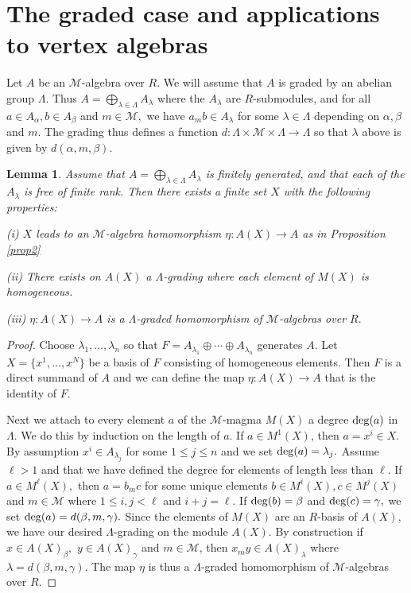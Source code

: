 \documentclass{article}
\newtheorem{lem}[thm]{Lemma}
\theoremstyle{definition}
\def\Mu{\ensuremath{\mathcal{M}}}
\begin{document}
	\section{The graded case and applications to vertex algebras}

Let $A$ be an $\Mu$-algebra over $R.$ We will assume that $A$ is graded by an abelian group $\Lambda.$ Thus $A = \bigoplus_{\lambda \in \Lambda} A_\lambda$ where the $A_\lambda$ are $R$-submodules, and for all $a \in A_\alpha, b \in A_\beta$ and $ m \in \Mu,$ we have $a _m b \in A_\lambda$ for some $\lambda \in \Lambda$ depending on $\alpha, \beta$ and $m.$ The grading thus  defines a function $d \colon \Lambda \times \Mu \times \Lambda \to \Lambda$ so that $\lambda$ above is given by $d(\alpha, m, \beta).$ 
\begin{lem}\label{graded} Assume that $A = \bigoplus_{\lambda \in \Lambda} A_\lambda$ is finitely generated, and that each of the $A_\lambda$ is free of finite rank. Then there exists a finite set $X$ with the following properties:

(i) $X$ leads to an $\Mu$-algebra homomorphism  $\eta \colon A(X) \to A$ as in Proposition \ref{prop2}

(ii) There exists on $A(X)$ a $\Lambda$-grading  where each element of $M(X)$ is homogeneous.

(iii)   $\eta \colon A(X) \to A$ is a $\Lambda$-graded homomorphism of $\Mu$-algebras over $R.$ 
\end{lem}
\begin{proof} Choose $\lambda_1, \dots, \lambda_n$ so that $F = A_{\lambda_1} \oplus \cdots \oplus A_{\lambda_n}$ generates $A.$  Let $X = \{x^1, \dots, x^N\}$ be a basis of $F$ consisting of homogeneous elements. Then $F$ is a direct summand of $A$ and we can define the map $\eta \colon A(X) \to A$ that is the identity of $F.$ 

Next we attach to every element $a$ of  the $\Mu$-magma $M(X)$ a degree ${\rm deg}(a)$ in $\Lambda. $ We do this by induction on the length of $a.$ If $a \in M^1(X)$, then $a = x^i \in X.$  By assumption $x^i \in A_{\lambda_j}$ for 
some $1 \leq j \leq n$ and we set ${\rm deg}(a) = \lambda_j.$  Assume $\ell > 1$ and that we have defined the degree for elements of length less than $\ell.$ If $a \in M^\ell(X),$ then $a = b_mc$ for some unique elements $b \in M^i(X), c \in M^j(X)$ and $m \in \Mu$ where $1 \leq i,j < \ell$ and $i + j = \ell.$ If ${\rm deg}(b) =\beta$ and ${\rm deg}(c) =\gamma,$ we set ${\rm deg}(a) = d(\beta,m,\gamma).$ Since the elements of $M(X)$ are an $R$-basis of $A(X),$ we have our desired $\Lambda$-grading on the module $A(X).$ By construction  if $x \in A(X)_\beta,$ $y \in A(X)_\gamma$ and $m \in \Mu$, then $x_my \in A(X)_\lambda$ where $\lambda = d(\beta, m, \gamma).$ The map $\eta$ is thus a $\Lambda$-graded homomorphism of $\Mu$-algebras over $R.$
\end{proof}
\end{document}
